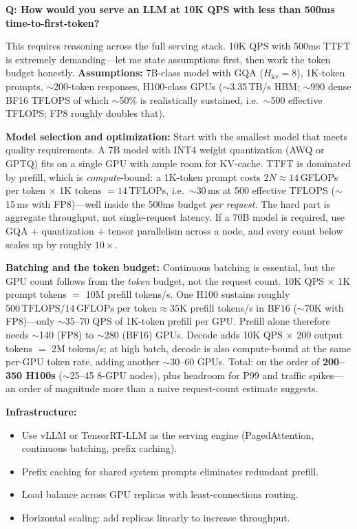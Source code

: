 \begin{interviewq}
\textbf{Q: How would you serve an LLM at 10K QPS with less than 500ms time-to-first-token?}

 \quad {} \quad \badgefreq{\freqhigh}

\stronganswer
This requires reasoning across the full serving stack.  10K QPS with 500ms TTFT is
extremely demanding---let me state assumptions first, then work the token budget
honestly.  \textbf{Assumptions:} 7B-class model with GQA ($H_{\text{kv}}{=}8$),
1K-token prompts, $\sim$200-token responses, H100-class GPUs ($\sim$3.35\,TB/s HBM;
$\sim$990 dense BF16 TFLOPS of which $\sim$50\% is realistically sustained, i.e.\
$\sim$500 effective TFLOPS; FP8 roughly doubles that).

\textbf{Model selection and optimization:}  Start with the smallest model that meets
quality requirements.  A 7B model with INT4 weight quantization (AWQ or GPTQ) fits on
a single GPU with ample room for KV-cache.  TTFT is dominated by prefill, which is
\emph{compute}-bound: a 1K-token prompt costs $2N \approx 14$\,GFLOPs per token
$\times$ 1K tokens $= 14$\,TFLOPs, i.e.\ $\sim$30\,ms at 500 effective TFLOPS
($\sim$15\,ms with FP8)---well inside the 500ms budget \emph{per request}.  The hard
part is aggregate throughput, not single-request latency.  If a 70B model is required,
use GQA + quantization + tensor parallelism across a node, and every count below
scales up by roughly $10\times$.

\textbf{Batching and the token budget:}  Continuous batching is essential, but the GPU
count follows from the \emph{token} budget, not the request count.  10K QPS $\times$
1K prompt tokens $=$ 10M prefill tokens/s.  One H100 sustains roughly
$500\,\text{TFLOPS} / 14\,\text{GFLOPs per token} \approx 35\text{K}$ prefill tokens/s
in BF16 ($\sim$70K with FP8)---only $\sim$35--70 QPS of 1K-token prefill per GPU.
Prefill alone therefore needs $\sim$140 (FP8) to $\sim$280 (BF16) GPUs.  Decode adds
10K QPS $\times$ 200 output tokens $=$ 2M tokens/s; at high batch, decode is also
compute-bound at the same per-GPU token rate, adding another $\sim$30--60 GPUs.
Total: on the order of \textbf{200--350 H100s} ($\sim$25--45 8-GPU nodes), plus
headroom for P99 and traffic spikes---an order of magnitude more than a naive
request-count estimate suggests.

\textbf{Infrastructure:}
\begin{itemize}
    \item Use vLLM or TensorRT-LLM as the serving engine (PagedAttention, continuous
          batching, prefix caching).
    \item Prefix caching for shared system prompts eliminates redundant prefill.
    \item Load balance across GPU replicas with least-connections routing.
    \item Horizontal scaling: add replicas linearly to increase throughput.
\end{itemize}


\end{interviewq}
